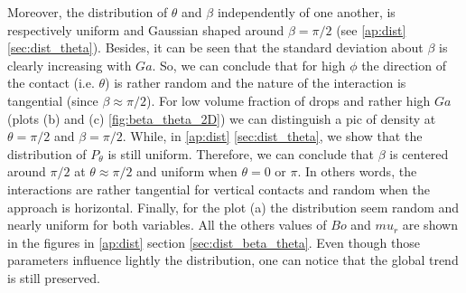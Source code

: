 Moreover, the distribution of $\theta$ and $\beta$ independently of one another, is respectively uniform and Gaussian shaped around $\beta = \pi/2$ (see \ref{ap:dist} \ref{sec:dist_theta}).
Besides, it can be seen that the standard deviation  about $\beta$ is clearly increasing with $Ga$. 
So, we can conclude that for high $\phi$ the direction of the contact (i.e. $\theta$) is rather random and the nature of the interaction is tangential (since $\beta \approx \pi/2$). 
For low volume fraction of drops and rather high $Ga$ (plots (b) and (c) \ref{fig:beta_theta_2D}) we can distinguish a pic of density at $\theta = \pi/2$ and $\beta = \pi/2$. 
While, in \ref{ap:dist} \ref{sec:dist_theta}, we show that the distribution of $P_\theta$ is still uniform. 
Therefore, we can conclude that $\beta$ is centered around $\pi/2$ at $\theta \approx \pi/2$ and uniform when $\theta = 0$ or $\pi$. 
In others words, the interactions are rather tangential for vertical contacts and random when the approach is horizontal. 
Finally, for the plot (a) the distribution seem random and nearly uniform for both variables. 
All the others values of $Bo$ and $mu_r$ are shown in the figures in \ref{ap:dist} section \ref{sec:dist_beta_theta}.
Even though  those parameters influence lightly the distribution, one can notice that the global trend is still preserved.

